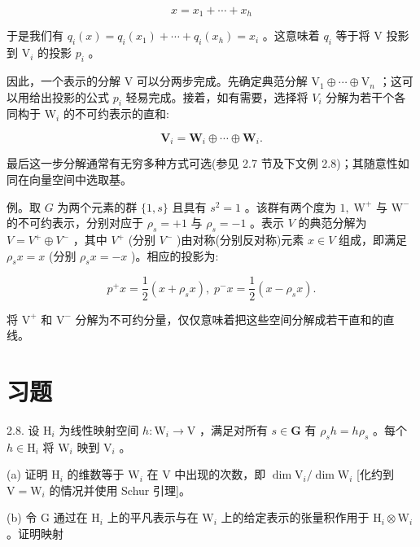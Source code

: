 \documentclass[10pt]{article}
\begin{document}
\[
x = {x}_{1} + \cdots  + {x}_{h}
\]

于是我们有 \({q}_{i}\left( x\right)  = {q}_{i}\left( {x}_{1}\right)  + \cdots  + {q}_{i}\left( {x}_{h}\right)  = {x}_{i}\) 。这意味着 \({q}_{i}\) 等于将 \(\mathrm{V}\) 投影到 \({\mathrm{V}}_{i}\) 的投影 \({p}_{i}\) 。

因此，一个表示的分解 \(\mathrm{V}\) 可以分两步完成。先确定典范分解 \({\mathrm{V}}_{1} \oplus  \cdots  \oplus  {\mathrm{V}}_{n}\) ；这可以用给出投影的公式 \({p}_{i}\) 轻易完成。接着，如有需要，选择将 \({V}_{i}\) 分解为若干个各同构于 \({\mathrm{W}}_{i}\) 的不可约表示的直和:

\[
{\mathbf{V}}_{i} = {\mathbf{W}}_{i} \oplus  \cdots  \oplus  {\mathbf{W}}_{i}.
\]

最后这一步分解通常有无穷多种方式可选(参见 2.7 节及下文例 2.8)；其随意性如同在向量空间中选取基。

例。取 \(G\) 为两个元素的群 \(\{ 1,s\}\) 且具有 \({s}^{2} = 1\) 。该群有两个度为 \(1,{\mathrm{\;W}}^{ + }\) 与 \({\mathrm{W}}^{ - }\) 的不可约表示，分别对应于 \({\rho }_{s} =  + 1\) 与 \({\rho }_{s} =  - 1\) 。表示 \(V\) 的典范分解为 \(V = {V}^{ + } \oplus  {V}^{ - }\) ，其中 \({V}^{ + }\) (分别 \({V}^{ - }\) )由对称(分别反对称)元素 \(x \in  V\) 组成，即满足 \({\rho }_{s}x = x\) (分别 \({\rho }_{s}x =  - x\) )。相应的投影为:

\[
{p}^{ + }x = \frac{1}{2}\left( {x + {\rho }_{s}x}\right) ,\;{p}^{ - }x = \frac{1}{2}\left( {x - {\rho }_{s}x}\right) .
\]

将 \({\mathrm{V}}^{ + }\) 和 \({\mathrm{V}}^{ - }\) 分解为不可约分量，仅仅意味着把这些空间分解成若干直和的直线。

\section*{习题}

2.8. 设 \({\mathrm{H}}_{i}\) 为线性映射空间 \(h : {\mathrm{W}}_{i} \rightarrow  \mathrm{V}\) ，满足对所有 \(s \in  \mathbf{G}\) 有 \({\rho }_{s}h = h{\rho }_{s}\) 。每个 \(h \in  {\mathrm{H}}_{i}\) 将 \({\mathrm{W}}_{i}\) 映到 \({\mathrm{V}}_{i}\) 。

(a) 证明 \({\mathrm{H}}_{i}\) 的维数等于 \({\mathrm{W}}_{i}\) 在 \(\mathrm{V}\) 中出现的次数，即 \(\dim {\mathrm{V}}_{i}/\dim {\mathrm{W}}_{i}\) [化约到 \(\mathrm{V} = {\mathrm{W}}_{i}\) 的情况并使用 Schur 引理]。

(b) 令 \(\mathrm{G}\) 通过在 \({\mathrm{H}}_{i}\) 上的平凡表示与在 \({\mathrm{W}}_{i}\) 上的给定表示的张量积作用于 \({\mathrm{H}}_{i} \otimes  {\mathrm{W}}_{i}\) 。证明映射
\end{document}
